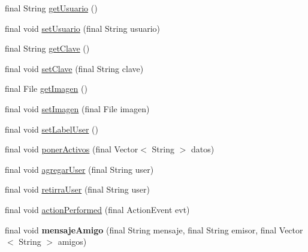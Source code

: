 \begin{DoxyCompactItemize}
\item 
final String \hyperlink{classcom_1_1ucab_1_1javachat_1_1_cliente_1_1controller_1_1_controlador_cliente_ada03c074086d0d54321cdf0347147397}{get\-Usuario} ()
\item 
final void \hyperlink{classcom_1_1ucab_1_1javachat_1_1_cliente_1_1controller_1_1_controlador_cliente_a29e6cb2c38d42517282ce2da900b3516}{set\-Usuario} (final String usuario)
\item 
final String \hyperlink{classcom_1_1ucab_1_1javachat_1_1_cliente_1_1controller_1_1_controlador_cliente_a3e147fa15044b926e8f496e15153e8f9}{get\-Clave} ()
\item 
final void \hyperlink{classcom_1_1ucab_1_1javachat_1_1_cliente_1_1controller_1_1_controlador_cliente_a8647e56fdb735f7abdef284b023e9f53}{set\-Clave} (final String clave)
\item 
final File \hyperlink{classcom_1_1ucab_1_1javachat_1_1_cliente_1_1controller_1_1_controlador_cliente_adb75ed57c31baca876b69990bbafb400}{get\-Imagen} ()
\item 
final void \hyperlink{classcom_1_1ucab_1_1javachat_1_1_cliente_1_1controller_1_1_controlador_cliente_a6e7b9e6c4a82829efbd0aae6c2658184}{set\-Imagen} (final File imagen)
\item 
final void \hyperlink{classcom_1_1ucab_1_1javachat_1_1_cliente_1_1controller_1_1_controlador_cliente_aa19a69efd4f74891f467345498ddcb39}{set\-Label\-User} ()
\item 
final void \hyperlink{classcom_1_1ucab_1_1javachat_1_1_cliente_1_1controller_1_1_controlador_cliente_a0ec86bb408cc78782346b4c01b95a7d6}{poner\-Activos} (final Vector$<$ String $>$ datos)
\item 
final void \hyperlink{classcom_1_1ucab_1_1javachat_1_1_cliente_1_1controller_1_1_controlador_cliente_a3aff80775389cf97755cd5c7db915603}{agregar\-User} (final String user)
\item 
final void \hyperlink{classcom_1_1ucab_1_1javachat_1_1_cliente_1_1controller_1_1_controlador_cliente_abb244f9e8904743e123c5e86a42c4710}{retirra\-User} (final String user)
\item 
final void \hyperlink{classcom_1_1ucab_1_1javachat_1_1_cliente_1_1controller_1_1_controlador_cliente_a132f8481c0894cdad40225f8541931a0}{action\-Performed} (final Action\-Event evt)
\item 
\hypertarget{classcom_1_1ucab_1_1javachat_1_1_cliente_1_1controller_1_1_controlador_cliente_aad384e7a7cfd86adf60b62591a5d49ff}{final void {\bfseries mensaje\-Amigo} (final String mensaje, final String emisor, final Vector$<$ String $>$ amigos)}\label{classcom_1_1ucab_1_1javachat_1_1_cliente_1_1controller_1_1_controlador_cliente_aad384e7a7cfd86adf60b62591a5d49ff}

\end{DoxyCompactItemize}


